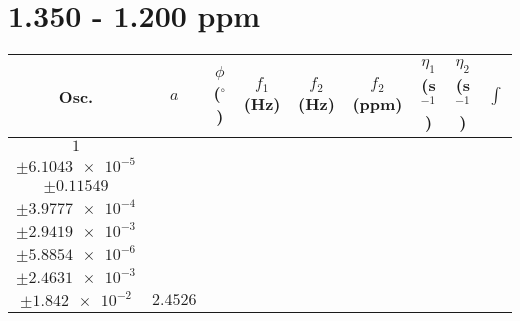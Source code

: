\documentclass[8pt]{article}
\begin{document}
\section*{1.350 - 1.200 ppm}
\begin{longtable}[l]{c c c c c c c c c}
\toprule
Osc. & $a$ & $\phi$ ($^{\circ}$) & $f_1$ (Hz) & $f_2$ (Hz) & $f_2$ (ppm) & $\eta_1$ (s$^{-1}$) & $\eta_2$ (s$^{-1}$) & $\int$\\
\midrule
$\num{1}$ & \begin{tabular}[c]{@{}c@{}}$\num{3.0525e-2}$ \\ $\pm\num{6.1043e-5}$\end{tabular} & \begin{tabular}[c]{@{}c@{}}$\num{0.40003}$ \\ $\pm\num{0.11549}$\end{tabular} & \begin{tabular}[c]{@{}c@{}}$\num{-8.5024}$ \\ $\pm\num{3.9777e-4}$\end{tabular} & \begin{tabular}[c]{@{}c@{}}$\num{629.31}$ \\ $\pm\num{2.9419e-3}$\end{tabular} & \begin{tabular}[c]{@{}c@{}}$\num{1.259}$ \\ $\pm\num{5.8854e-6}$\end{tabular} & \begin{tabular}[c]{@{}c@{}}$\num{1.1625}$ \\ $\pm\num{2.4631e-3}$\end{tabular} & \begin{tabular}[c]{@{}c@{}}$\num{4.1912}$ \\ $\pm\num{1.842e-2}$\end{tabular} & $\num{2.4526}$\\

\end{longtable}
\end{document}
